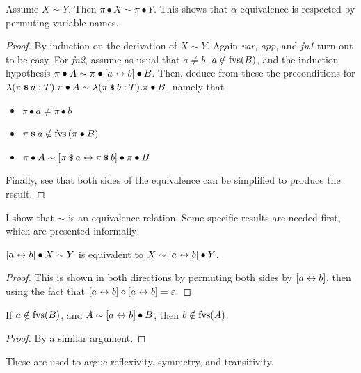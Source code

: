 \begin{lemma}
\label{lemma:prm-equivalent}
Assume \(X \sim Y\).
Then \(\pi \bullet X \sim \pi \bullet Y\).
This shows that \(\alpha\)-equivalence is respected by permuting variable names.
\end{lemma}
\begin{proof}
By induction on the derivation of \(X \sim Y\).
Again \emph{var}, \emph{app}, and \emph{fn1} turn out to be easy.
For \emph{fn2}, assume as usual that \(a \neq b\), \(a \notin \mathrm{fvs}(B)\), and the induction hypothesis \(\pi \bullet A \sim \pi \bullet [a \leftrightarrow b] \bullet B\).
Then, deduce from these the preconditions for \(\lambda (\pi \mathbin{\textrm{\footnotesize{\textbf{\$}}}} a:T). \pi \bullet A \sim \lambda (\pi \mathbin{\textrm{\footnotesize{\textbf{\$}}}} b:T). \pi \bullet B\), namely that
\begin{itemize}
\item
\(\pi \bullet a \neq \pi \bullet b\)
\item
\(\pi \mathbin{\textrm{\footnotesize{\textbf{\$}}}} a \notin \mathrm{fvs}\left(\pi \bullet B\right)\)
\item
\(\pi \bullet A \sim [\pi \mathbin{\textrm{\footnotesize{\textbf{\$}}}} a \leftrightarrow \pi \mathbin{\textrm{\footnotesize{\textbf{\$}}}} b] \bullet \pi \bullet B\)
\end{itemize}
Finally, see that both sides of the equivalence can be simplified to produce the result.
\end{proof}

I show that \(\sim\) is an equivalence relation.
Some specific results are needed first, which are presented informally:

\begin{lemma}
\label{lemma:transfer-swapping}
\([a \leftrightarrow b] \bullet X \sim Y\) is equivalent to \(X \sim [a \leftrightarrow b] \bullet Y\).
\end{lemma}
\begin{proof}
This is shown in both directions by permuting both sides by \([a \leftrightarrow b]\), then using the fact that \([a \leftrightarrow b] \diamond [a \leftrightarrow b] = \varepsilon\).
\end{proof}

\begin{lemma}
\label{lemma:transfer-freshness}
If \(a \notin \mathrm{fvs}(B)\), and \(A \sim [a \leftrightarrow b] \bullet B\), then \(b \notin \mathrm{fvs}(A)\).
\end{lemma}
\begin{proof}
By a similar argument.
\end{proof}

These are used to argue reflexivity, symmetry, and transitivity.

